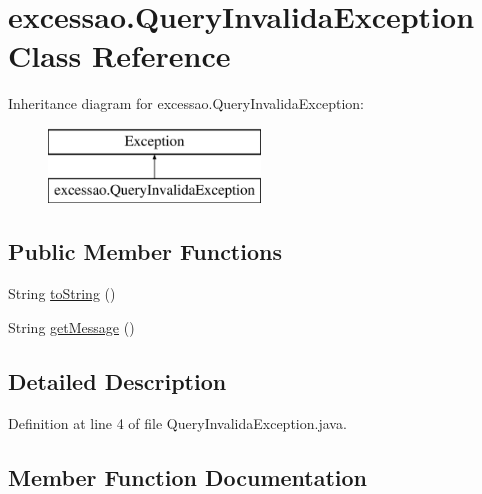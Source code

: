 \hypertarget{classexcessao_1_1QueryInvalidaException}{}\section{excessao.\+Query\+Invalida\+Exception Class Reference}
\label{classexcessao_1_1QueryInvalidaException}
Inheritance diagram for excessao.\+Query\+Invalida\+Exception\+:\begin{figure}[H]
\begin{center}
\leavevmode
\includegraphics[height=2.000000cm]{classexcessao_1_1QueryInvalidaException}
\end{center}
\end{figure}
\subsection*{Public Member Functions}
\begin{DoxyCompactItemize}
\item 
String \hyperlink{classexcessao_1_1QueryInvalidaException_ac49499062d57f2eeefc351a1d14e5ce8}{to\+String} ()
\item 
String \hyperlink{classexcessao_1_1QueryInvalidaException_a22978d034834306fbaf113f7ff2f499f}{get\+Message} ()
\end{DoxyCompactItemize}


\subsection{Detailed Description}


Definition at line 4 of file Query\+Invalida\+Exception.\+java.



\subsection{Member Function Documentation}
\hypertarget{classexcessao_1_1QueryInvalidaException_a22978d034834306fbaf113f7ff2f499f}{}\label{classexcessao_1_1QueryInvalidaException_a22978d034834306fbaf113f7ff2f499f} 
